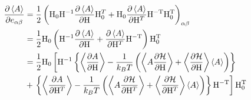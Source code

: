 \documentclass[11pt,a4paper,uplatex]{jsarticle}
\begin{document}
\begin{align}
    \frac{\partial \left<A\right>}{\partial e_{\alpha \beta}} &= \frac{1}{2}\left({\rm H_{0}H^{-1}}\frac{\partial \left<A\right>}{\partial {\rm H}}{\rm H}_{0}^{T} + {\rm H_{0}}\frac{\partial \left<A\right>}{\partial {\rm H}^T}{\rm H^{-T}}{\rm H_{0}^{T}}\right)_{\alpha \beta} \\    
    &= \frac{1}{2}{\rm H_{0}} \left( {\rm H^{-1}}\frac{\partial \left<A\right>}{\partial {\rm H}} 
    + \frac{\partial \left<A\right>}{\partial {\rm H}^T}{\rm H^{-T}}\right) {\rm H_{0}^{T}} \\  
    &= \frac{1}{2}{\rm H_{0}} \left[ {\rm H^{-1}} \left\{ \left< \frac{\partial A}{\partial {\rm H}}  \right> -\frac{1}{k_{B}T} \left(\left< A \frac{\partial {\cal H}}{\partial {\rm H}} \right>  + \left< \frac{\partial {\cal H}}{\partial {\rm H}}\right> \left< A \right> \right) \right \}\right. \\
    &+ \left. \left\{ \left< \frac{\partial A}{\partial {\rm H}^{T}}  \right> -\frac{1}{k_{B}T} \left(\left< A \frac{\partial {\cal H}}{\partial {\rm H}^{T}} \right>  + \left< \frac{\partial {\cal H}}{\partial {\rm H}^{T}}\right> \left< A \right> \right) \right\} {\rm H^{-T}}\right] {\rm H_{0}^{T}} \\ 
\end{align}

\end{document}
